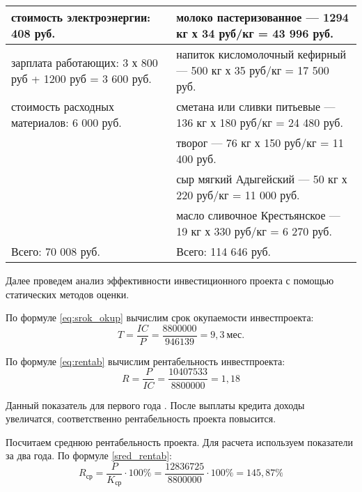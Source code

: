 \begin{table}[]
\begin{tabularx}{\textwidth}{|p{8.05cm}|p{8.05cm}|}
		стоимость электроэнергии: 408 руб.                 & молоко пастеризованное — 1294 кг х 34 руб/кг = 43 996 руб.          \\ \hline
		зарплата работающих: 3 х 800 руб + 1200 руб = 3 600 руб.                                    & напиток кисломолочный кефирный — 500 кг х 35 руб/кг = 17 500 руб.   \\ \hline
		стоимость расходных материалов: 6 000 руб.                & сметана или сливки питьевые — 136 кг х 180 руб/кг = 24 480 руб.     \\ \hline
		                              																& творог — 76 кг х 150 руб/кг = 11 400 руб.                           \\ \cline{2-2}
																									& сыр мягкий Адыгейский — 50 кг х 220 руб/кг = 11 000 руб.            \\ \cline{2-2}
																									& масло сливочное Крестьянское — 19 кг х 330 руб/кг = 6 270 руб.      \\ \hline
		Всего:  70 008 руб.                                                    			 & Всего: 114 646 руб.                                                 \\ \hline
	\end{tabularx}
\end{table}

Далее проведем анализ эффективности инвестиционного проекта с помощью статических методов оценки.



По формуле \eqref{eq:srok_okup} вычислим срок окупаемости инвестпроекта:
\begin{equation*}
T=\dfrac{IC}{P} = \dfrac{8 800 000}{946 139} = 9,3\  \text{мес.}
\end{equation*}

По формуле \eqref{eq:rentab} вычислим рентабельность инвестпроекта:
\begin{equation*}
R = \dfrac{P}{IC} = \dfrac{10407533}{8800000} = 1,18
\end{equation*}

Данный показатель для первого года . После выплаты кредита доходы увеличатся, соответственно рентабельность проекта повысится.

Посчитаем среднюю рентабельность проекта. Для расчета используем показатели за два года. По формуле \eqref{sred_rentab}:
\begin{equation*}
R_{\text{ср}} = \dfrac{P}{K_{\text{ср}}} \cdot 100\% = \dfrac{12836725}{8800000} \cdot 100\% = 145,87\%
\end{equation*}

